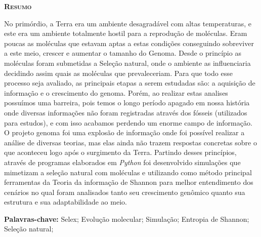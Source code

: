 \begin{center}
\textsc{\textbf{\Large Resumo }}
\end{center}

No primórdio, a Terra era um ambiente desagradável com altas
temperaturas, e este era um ambiente totalmente hostil para a reprodução de
moléculas. Eram poucas as moléculas que estavam aptas a estas condições
conseguindo sobreviver a este meio, crescer e aumentar o tamanho do Genoma.
Desde o princípio as moléculas foram submetidas a Seleção natural, onde o
ambiente as influenciaria decidindo assim quais as moléculas que
prevaleceriam. Para que todo esse processo seja avaliado, as principais etapas
a serem estudadas são: a aquisição de informação e o crescimento do genoma.
Porém, ao realizar estas analises possuímos uma barreira, pois temos o longo
período apagado em nossa história onde diversas informações não foram
registradas através dos fósseis (utilizados para estudos), e com isso acabamos
perdendo um enorme campo de informação. O projeto genoma foi uma explosão
de informação onde foi possível realizar a análise de diversas teorias, mas elas
ainda não trazem respostas concretas sobre o que aconteceu logo após o
surgimento da Terra. Partindo desses princípios, através de programas
elaborados em \emph{Python} foi desenvolvido simulações que mimetizam a seleção
natural com moléculas e utilizando como método principal ferramentas da Teoria
da informação de Shannon para melhor entendimento dos cenários no qual
foram analisados tanto seu crescimento genômico quanto sua estrutura e sua
adaptabilidade ao meio.

\vspace{2cm}
\textbf{Palavras-chave:} Selex; Evolução molecular; Simulação; Entropia de Shannon;
Seleção natural;